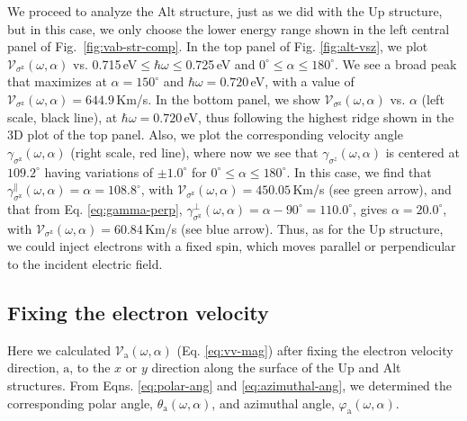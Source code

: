 \documentclass[floatfix,prb,aps,superscriptaddress,showpacs,11pt,preprint,letterpaper]{revtex4}
\begin{document}
We proceed to analyze the Alt structure, just as we did with the Up structure,
but in this case, we only choose the lower energy range shown in the left
central panel of Fig.~\ref{fig:vab-str-comp}. In the top panel of Fig. 
\ref{fig:alt-vsz}, we plot $\mathcal{V}_{\sigma^{\mathrm{z}}} (\omega,\alpha)$
vs. 0.715\,eV$\leq\hbar\omega\leq$0.725\,eV and $0^\circ\leq\alpha\leq
180^\circ$. We see a broad peak that maximizes at $\alpha=150^{\circ}$ and
$\hbar\omega= 0.720$\,eV, with a value of
$\mathcal{V}_{\sigma^{\mathrm{z}}}(\omega,\alpha) = 644.9$\,Km/s. In the bottom
panel, we  show $\mathcal{V}_{\sigma^{\mathrm{z}}} (\omega,\alpha)$ vs.
$\alpha$ (left scale, black line), at $\hbar\omega= 0.720$\,eV, thus following
the highest ridge shown in the 3D plot of the top panel. Also, we plot the
corresponding velocity angle $\gamma_{\sigma^\mathrm{z}} (\omega,\alpha)$
(right scale, red line), where now we see that
$\gamma_{\sigma^z}(\omega,\alpha)$ is centered at $109.2^{\circ}$ having
variations of $\pm 1.0^{\circ}$ for $0^{\circ} \leq
\alpha \leq 180^{\circ}$. In this case, we find that
$\gamma^\parallel_{\sigma^\mathrm{z}} (\omega,\alpha) =
\alpha = 108.8^\circ$, with $\mathcal{V}_{\sigma^{\mathrm{z}}} (\omega,\alpha)
= 450.05$\,Km/s (see green arrow), and that from Eq. \eqref{eq:gamma-perp},
$\gamma^\perp_{\sigma^\mathrm{z}}(\omega,\alpha)=\alpha-90^\circ=110.0^\circ$,
gives $\alpha=20.0^\circ$, with $\mathcal{V}_{\sigma^{\mathrm{z}}}
(\omega,\alpha) = 60.84$\,Km/s (see blue arrow). Thus, as for the Up structure,
we could inject electrons with a fixed spin, which moves parallel or
perpendicular to the incident electric field.

\subsection{Fixing the electron velocity} 
\label{sec:res-fixvel}

Here we calculated $\mathcal{V}_{\mathrm{a}}(\omega,\alpha)$ (Eq. 
\eqref{eq:vv-mag}) after fixing the electron velocity direction, $\mathrm{a}$,
to the $x$ or $y$ direction along the surface of the Up and Alt structures.
From Eqns. \eqref{eq:polar-ang} and \eqref{eq:azimuthal-ang}, {\color{blue}we
determined the corresponding polar angle, $\theta_{\mathrm{a}}
(\omega,\alpha)$, and azimuthal angle, $\varphi_{\mathrm{a}} (\omega,\alpha)$}.
\end{document}
